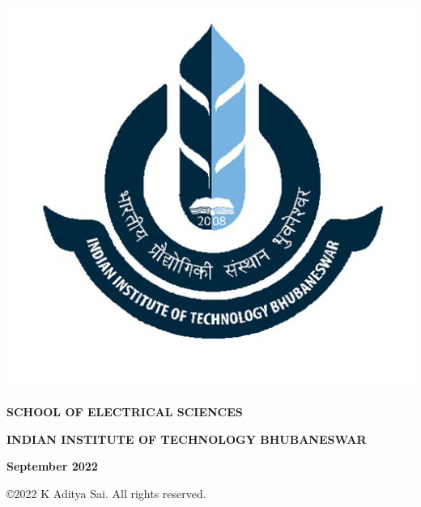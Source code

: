 \begin{titlepage}
\begin{center}
\includegraphics[scale=0.3]{iitbbs}
\end{center}
 \vspace{-1em}
\begin{center}
 \textbf{\small SCHOOL OF ELECTRICAL SCIENCES}
\end{center}
 \vspace{-3em}
\begin{center}
 \textbf{\small INDIAN INSTITUTE OF TECHNOLOGY BHUBANESWAR} 
\end{center}
 \vspace{-3em}
\begin{center}
 \textbf{September 2022}
\end{center}
 \vspace{-3em}
\begin{center}
 \copyright 2022 K Aditya Sai. All rights reserved.
\end{center}
\cleardoublepage

\end{titlepage}

